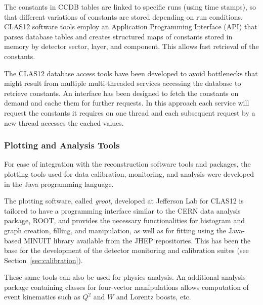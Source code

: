 The constants in CCDB tables are linked  to specific runs (using time stamps), so that different
variations of constants are stored depending on run conditions. CLAS12 software tools employ an Application Programming
Interface (API) that parses database tables and creates structured maps of constants stored in  memory by
detector sector, layer, and component. This allows fast retrieval of the constants.

The CLAS12 database access tools have been developed to avoid bottlenecks that might result from multiple
multi-threaded services accessing the database to retrieve constants.  An interface has been designed to fetch
the constants on demand and cache them for further requests. In this approach each service will request the
constants it requires on one thread and each subsequent request by a new thread accesses
the cached values.

\subsubsection{Plotting and Analysis Tools}

For ease of integration with the reconstruction software tools and packages, the plotting tools used for data
calibration, monitoring, and analysis were developed in the Java programming language.

The plotting software, called {\it groot}, developed at Jefferson Lab for CLAS12 is tailored to have a programming
interface similar to the CERN data analysis package, ROOT, and provides the necessary functionalities for
histogram and graph creation, filling, and manipulation, as well as for fitting using the Java-based MINUIT library
available from the JHEP repositories. This has been the base for the development of the detector monitoring and
calibration suites (see Section~\ref{sec:calibration}).

These same tools can also be used for physics analysis.
An additional analysis package containing classes for
four-vector manipulations allows computation of event kinematics such as $Q^2$ and $W$ and Lorentz
boosts, etc. 

